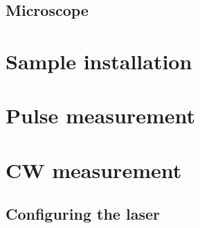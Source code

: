 \documentclass[14pt,a4paper] {article}
\begin{document}
 
\subsection{Microscope}


\section{Sample installation}

\section{Pulse measurement}

\section{CW measurement}


\subsection{Configuring the laser}


\end{document}

